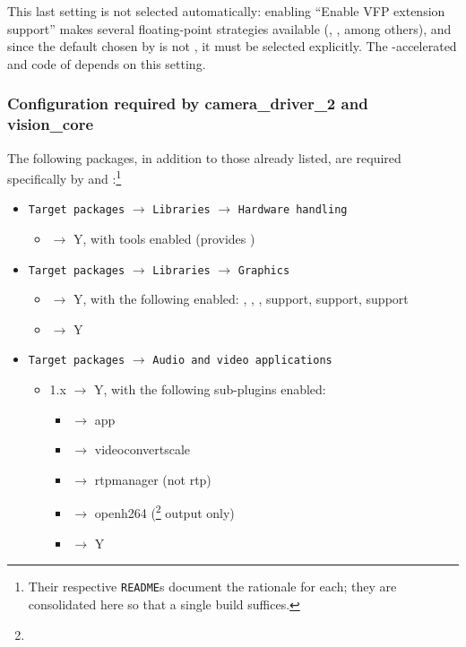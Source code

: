 This last setting is not selected automatically: enabling ``Enable VFP extension support'' makes several floating-point strategies available (, , among others), and since the default chosen by  is not , it must be selected explicitly. The -accelerated  and  code of  depends on this setting.

\subsubsection{Configuration required by camera\_driver\_2 and vision\_core}

The following packages, in addition to those already listed, are required specifically by  and :\footnote{Their respective \texttt{README}s document the rationale for each; they are consolidated here so that a single build suffices.}

\begin{itemize}
    \item \texttt{Target packages} $\rightarrow$ \texttt{Libraries} $\rightarrow$ \texttt{Hardware handling}
    \begin{itemize}
        \item {} $\rightarrow$ Y, with  tools enabled (provides )
    \end{itemize}
    \item \texttt{Target packages} $\rightarrow$ \texttt{Libraries} $\rightarrow$ \texttt{Graphics}
    \begin{itemize}
        \item {} $\rightarrow$ Y, with the following enabled: , , ,  support,  support,  support
        \item {} $\rightarrow$ Y
    \end{itemize}
    \item \texttt{Target packages} $\rightarrow$ \texttt{Audio and video applications}
    \begin{itemize}
        \item {} 1.x $\rightarrow$ Y, with the following sub-plugins enabled:
        \begin{itemize}
            \item {} $\rightarrow$ app
            \item {} $\rightarrow$ videoconvertscale
            \item {} $\rightarrow$ rtpmanager (not rtp)
            \item {} $\rightarrow$ openh264 (\footnote{} output only)
            \item {} $\rightarrow$ Y
        \end{itemize}
    \end{itemize}
\end{itemize}

